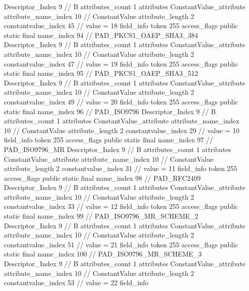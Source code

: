 {{{{{				Descriptor_Index	9		// B
				attributes_count	1
				attributes {
				ConstantValue_attribute {
					attribute_name_index	10		// ConstantValue
					attribute_length	2
					constantvalue_index	45		// value = 18
				}
				}
			}
			field_info {
				token	255
				access_flags	public static final
				name_index	94		// PAD_PKCS1_OAEP_SHA3_384
				Descriptor_Index	9		// B
				attributes_count	1
				attributes {
				ConstantValue_attribute {
					attribute_name_index	10		// ConstantValue
					attribute_length	2
					constantvalue_index	47		// value = 19
				}
				}
			}
			field_info {
				token	255
				access_flags	public static final
				name_index	95		// PAD_PKCS1_OAEP_SHA3_512
				Descriptor_Index	9		// B
				attributes_count	1
				attributes {
				ConstantValue_attribute {
					attribute_name_index	10		// ConstantValue
					attribute_length	2
					constantvalue_index	49		// value = 20
				}
				}
			}
			field_info {
				token	255
				access_flags	public static final
				name_index	96		// PAD_ISO9796
				Descriptor_Index	9		// B
				attributes_count	1
				attributes {
				ConstantValue_attribute {
					attribute_name_index	10		// ConstantValue
					attribute_length	2
					constantvalue_index	29		// value = 10
				}
				}
			}
			field_info {
				token	255
				access_flags	public static final
				name_index	97		// PAD_ISO9796_MR
				Descriptor_Index	9		// B
				attributes_count	1
				attributes {
				ConstantValue_attribute {
					attribute_name_index	10		// ConstantValue
					attribute_length	2
					constantvalue_index	31		// value = 11
				}
				}
			}
			field_info {
				token	255
				access_flags	public static final
				name_index	98		// PAD_RFC2409
				Descriptor_Index	9		// B
				attributes_count	1
				attributes {
				ConstantValue_attribute {
					attribute_name_index	10		// ConstantValue
					attribute_length	2
					constantvalue_index	33		// value = 12
				}
				}
			}
			field_info {
				token	255
				access_flags	public static final
				name_index	99		// PAD_ISO9796_MR_SCHEME_2
				Descriptor_Index	9		// B
				attributes_count	1
				attributes {
				ConstantValue_attribute {
					attribute_name_index	10		// ConstantValue
					attribute_length	2
					constantvalue_index	51		// value = 21
				}
				}
			}
			field_info {
				token	255
				access_flags	public static final
				name_index	100		// PAD_ISO9796_MR_SCHEME_3
				Descriptor_Index	9		// B
				attributes_count	1
				attributes {
				ConstantValue_attribute {
					attribute_name_index	10		// ConstantValue
					attribute_length	2
					constantvalue_index	53		// value = 22
				}
				}
			}
			field_info {
}}}}}
